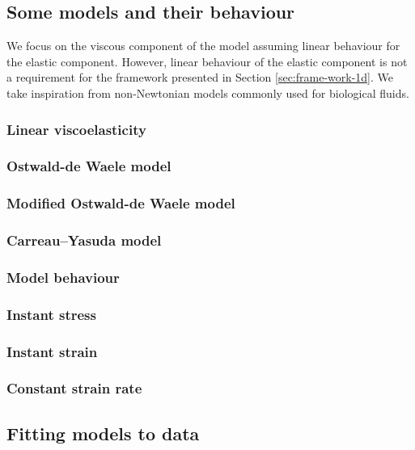 \documentclass[12pt]{article}
\begin{document}
\subsection{Some models and their behaviour}

We focus on the viscous component of the model assuming linear behaviour for the elastic component. However, linear behaviour of the elastic component is not a requirement for the framework presented in Section \ref{sec:frame-work-1d}. We take inspiration from non-Newtonian models commonly used for biological fluids.

\subsubsection{Linear viscoelasticity}

\subsubsection{Ostwald-de Waele model}

\subsubsection{Modified Ostwald-de Waele model}

\subsubsection{Carreau--Yasuda model}

\subsubsection{Model behaviour}

\subsubsection*{Instant stress}
\subsubsection*{Instant strain}
\subsubsection*{Constant strain rate}

\subsection{Fitting models to data}
\end{document}

